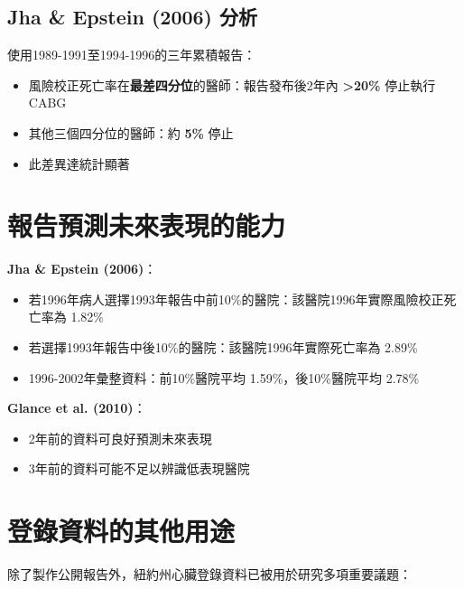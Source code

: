 \documentclass[12pt,a4paper]{article}
\begin{document}
\subsection{Jha \& Epstein (2006) 分析}

使用1989-1991至1994-1996的三年累積報告：
\begin{itemize}
    \item 風險校正死亡率在\textbf{最差四分位}的醫師：報告發布後2年內 \textbf{>20\%} 停止執行 CABG
    \item 其他三個四分位的醫師：約 \textbf{5\%} 停止
    \item 此差異達統計顯著
\end{itemize}

\section{報告預測未來表現的能力}

\textbf{Jha \& Epstein (2006)}：
\begin{itemize}
    \item 若1996年病人選擇1993年報告中前10\%的醫院：該醫院1996年實際風險校正死亡率為 1.82\%
    \item 若選擇1993年報告中後10\%的醫院：該醫院1996年實際死亡率為 2.89\%
    \item 1996-2002年彙整資料：前10\%醫院平均 1.59\%，後10\%醫院平均 2.78\%
\end{itemize}

\textbf{Glance et al. (2010)}：
\begin{itemize}
    \item 2年前的資料可良好預測未來表現
    \item 3年前的資料可能不足以辨識低表現醫院
\end{itemize}

\section{登錄資料的其他用途}

除了製作公開報告外，紐約州心臟登錄資料已被用於研究多項重要議題：
\end{document}
